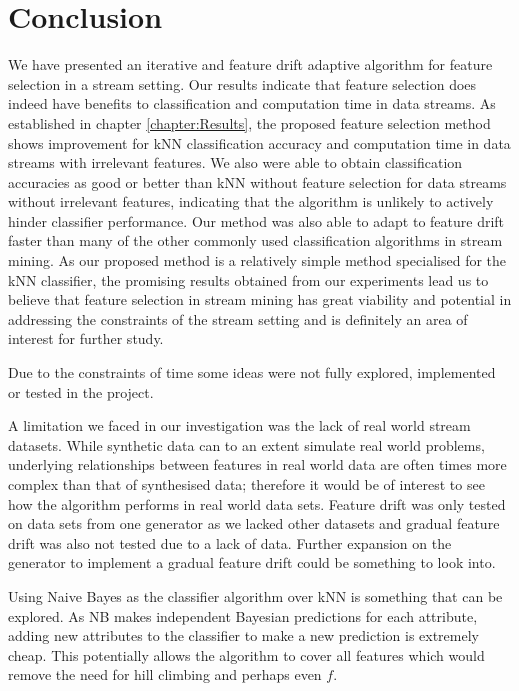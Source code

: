 \chapter{Conclusion}
\label{chapter:Conclusion}

We have presented an iterative and feature drift adaptive algorithm for feature selection in a stream setting. Our results indicate that feature selection does indeed have benefits to classification and computation time in data streams. As established in chapter \ref{chapter:Results}, the proposed feature selection method shows improvement for kNN classification accuracy and computation time in data streams with irrelevant features. We also were able to obtain classification accuracies as good or better than kNN without feature selection for data streams without irrelevant features, indicating that the algorithm is unlikely to actively hinder classifier performance. Our method was also able to adapt to feature drift faster than many of the other commonly used classification algorithms in stream mining. As our proposed method is a relatively simple method specialised for the kNN classifier, the promising results obtained from our experiments lead us to believe that feature selection in stream mining has great viability and potential in addressing the constraints of the stream setting and is definitely an area of interest for further study.

Due to the constraints of time some ideas were not fully explored, implemented or tested in the project.

A limitation we faced in our investigation was the lack of real world stream datasets. While synthetic data can to an extent simulate real world problems, underlying relationships between features in real world data are often times more complex than that of synthesised data; therefore it would be of interest to see how the algorithm performs in real world data sets. Feature drift was only tested on data sets from one generator as we lacked other datasets and gradual feature drift was also not tested due to a lack of data. Further expansion on the generator to implement a gradual feature drift could be something to look into.

Using Naive Bayes as the classifier algorithm over kNN is something that can be explored. As NB makes independent Bayesian predictions for each attribute, adding new attributes to the classifier to make a new prediction is extremely cheap. This potentially allows the algorithm to cover all features which would remove the need for hill climbing and perhaps even $f$.

